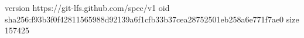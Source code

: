 version https://git-lfs.github.com/spec/v1
oid sha256:f93b3f0f42811565988d92139a6f1cfb33b37cea28752501eb258a6e771f7ae0
size 157425

